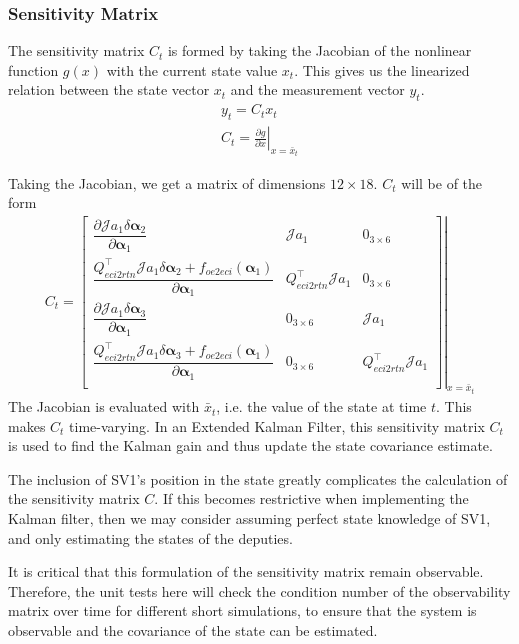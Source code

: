 \subsubsection{Sensitivity Matrix}

The sensitivity matrix $C_t$ is formed by taking the Jacobian of the nonlinear function $g(x)$ with the current state value $x_t$. This gives us the linearized relation between the state vector $x_t$ and the measurement vector $y_t$.
\begin{align}
    y_t = C_tx_t\\
    C_t = \left . \frac{\partial g}{\partial x} \right|_{x = \bar{x}_t}
\end{align}

Taking the Jacobian, we get a matrix of dimensions $12 \times 18$. $C_t$ will be of the form
\begin{align}
    C_t = \left.\begin{bmatrix}
        \dfrac{\partial \mathcal{J}a_1 \delta \boldsymbol{\alpha}_2}{\partial \boldsymbol{\alpha}_1}  & \mathcal{J}a_1 & 0_{3\times6} \\
        \dfrac{Q^\top_{eci2rtn} \mathcal{J}
a_1\delta \boldsymbol{\alpha}_2 + f_{oe2eci}(\boldsymbol{\alpha}_1)}{\partial \boldsymbol{\alpha}_1} & Q^\top_{eci2rtn} \mathcal{J}
a_1 & 0_{3\times6} \\
        \dfrac{\partial \mathcal{J}a_1 \delta \boldsymbol{\alpha}_3}{\partial \boldsymbol{\alpha}_1}  & 0_{3\times6}  & \mathcal{J}a_1 \\
        \dfrac{Q^\top_{eci2rtn} \mathcal{J}
a_1\delta \boldsymbol{\alpha}_3 + f_{oe2eci}(\boldsymbol{\alpha}_1)}{\partial \boldsymbol{\alpha}_1} & 0_{3\times6} & Q^\top_{eci2rtn} \mathcal{J}
a_1\\
    \end{bmatrix} \right|_{x = \bar{x}_t}
\end{align}
The Jacobian is evaluated with $\bar{x}_t$, i.e. the value of the state at time $t$. This makes $C_t$ time-varying. In an Extended Kalman Filter, this sensitivity matrix $C_t$ is used to find the Kalman gain and thus update the state covariance estimate.

The inclusion of SV1's position in the state greatly complicates the calculation of the sensitivity matrix $C$. If this becomes restrictive when implementing the Kalman filter, then we may consider assuming perfect state knowledge of SV1, and only estimating the states of the deputies. 

It is critical that this formulation of the sensitivity matrix remain observable. Therefore, the unit tests here will check the condition number of the observability matrix over time for different short simulations, to ensure that the system is observable and the covariance of the state can be estimated.






